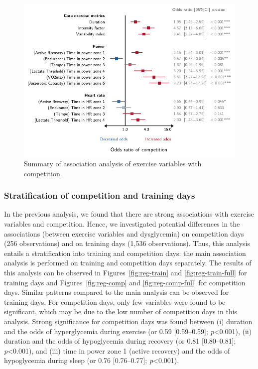 \documentclass[11pt,a4paper]{article}
\newcommand\pval{\textit{p}}
\begin{document}
\begin{figure}[H]
    \centering
    \caption{Summary of association analysis of exercise variables with competition.}
    \label{fig:reg-corr}
    \includegraphics[width=.8\textwidth]{figure/corr/coef_corr_binomial_competition.pdf}
\end{figure}

\subsubsection{Stratification of competition and training days}
In the previous analysis, we found that there are strong associations with exercise variables and competition. Hence, we investigated potential differences in the associations (between exercise variables and dysglycemia) on competition days (256 observations) and on training days (1,536 observations). Thus, this analysis entails a stratification into training and competition days: the main association analysis is performed on training and competition days separately. The results of this analysis can be observed in Figures~\ref{fig:reg-train} and \ref{fig:reg-train-full} for training days and Figures~\ref{fig:reg-comp} and \ref{fig:reg-comp-full} for competition days. Similar patterns compared to the main analysis can be observed for training days. For competition days, only few variables were found to be significant, which may be due to the low number of competition days in this analysis. Strong significance for competition days was found between (i) duration and the odds of hyperglycemia during exercise (\gls{or} 0.59 [0.59--0.59]; \pval<0.001), (ii) duration and the odds of hypoglycemia during recovery (\gls{or} 0.81 [0.80--0.81]; \pval<0.001), and (iii) time in power zone 1 (active recovery) and the odds of hypoglycemia during sleep (\gls{or} 0.76 [0.76--0.77]; \pval<0.001).
\end{document}
